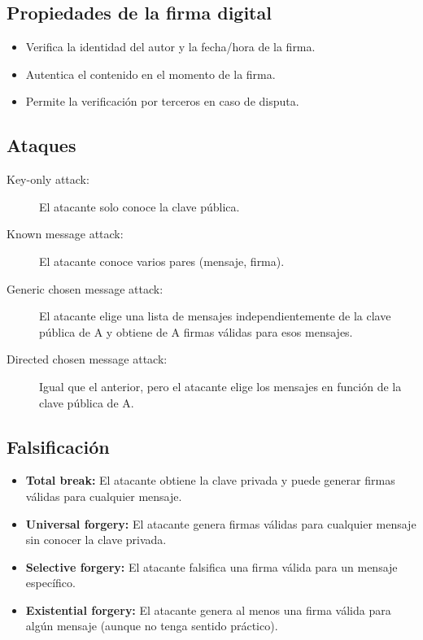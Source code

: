 \documentclass[11pt,a4paper]{article}
\begin{document}
\subsection{Propiedades de la firma digital}
\begin{itemize}
    \item Verifica la identidad del autor y la fecha/hora de la firma.
    \item Autentica el contenido en el momento de la firma.
    \item Permite la verificación por terceros en caso de disputa.
\end{itemize}

\subsection{Ataques}
\begin{description}
    \item[Key-only attack:] El atacante solo conoce la clave pública.
    \item[Known message attack:] El atacante conoce varios pares (mensaje, firma).
    \item[Generic chosen message attack:] El atacante elige una lista de mensajes independientemente de la clave pública de A y obtiene de A firmas válidas para esos mensajes.
    \item[Directed chosen message attack:] Igual que el anterior, pero el atacante elige los mensajes en función de la clave pública de A.
\end{description}

\subsection{Falsificación}
\begin{itemize}
    \item \textbf{Total break:} El atacante obtiene la clave privada y puede generar firmas válidas para cualquier mensaje.
    \item \textbf{Universal forgery:} El atacante genera firmas válidas para cualquier mensaje sin conocer la clave privada.
    \item \textbf{Selective forgery:} El atacante falsifica una firma válida para un mensaje específico.
    \item \textbf{Existential forgery:} El atacante genera al menos una firma válida para algún mensaje (aunque no tenga sentido práctico).
\end{itemize}
\end{document}
